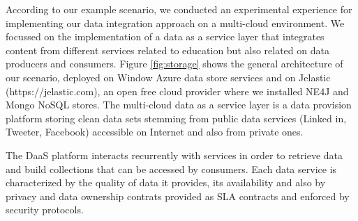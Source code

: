 \begin{figure}
\end{figure}

According to our example scenario, we conducted an experimental experience for implementing our data integration approach on a multi-cloud environment. We focussed on the implementation of a data as a service layer that integrates content from different services related to education but also related on data producers and consumers. Figure \ref{fig:storage} shows the general architecture of our scenario, deployed on Window Azure data store services and on Jelastic (https://jelastic.com), an open free cloud provider where we installed NE4J and Mongo NoSQL stores. The multi-cloud data as a service layer is a data provision platform storing clean data sets stemming from public data services (Linked in, Tweeter, Facebook) accessible on Internet and also from private ones. 

The DaaS platform interacts recurrently with services in order to retrieve data and build collections that can be accessed by consumers. Each data service is characterized by the quality of data it provides, its availability and also by privacy and data ownership contrats provided as SLA contracts and enforced by security protocols.
